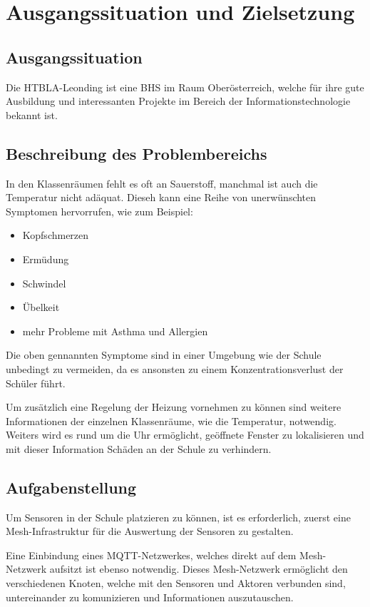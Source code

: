\chapter{Ausgangssituation und Zielsetzung}

\section{Ausgangssituation}
Die HTBLA-Leonding ist eine BHS im Raum Oberösterreich, welche für ihre gute Ausbildung und interessanten Projekte im Bereich der Informationstechnologie bekannt ist.

\section{Beschreibung des Problembereichs}
In den Klassenräumen fehlt es oft an Sauerstoff, manchmal ist auch die Temperatur nicht adäquat. Dieseh kann eine Reihe von unerwünschten Symptomen hervorrufen, wie zum Beispiel: 

\begin{itemize}
    \item Kopfschmerzen
    \item Ermüdung
    \item Schwindel
    \item Übelkeit
    \item mehr Probleme mit Asthma und Allergien
\end{itemize}

Die oben gennannten Symptome sind in einer Umgebung wie der Schule unbedingt zu vermeiden, da es ansonsten zu einem Konzentrationsverlust der Schüler führt.

Um zusätzlich eine Regelung der Heizung vornehmen zu können sind weitere Informationen der einzelnen Klassenräume, wie die Temperatur, notwendig. Weiters wird es rund um die Uhr ermöglicht,  geöffnete Fenster zu lokalisieren und mit dieser Information Schäden an der Schule zu verhindern.

\section{Aufgabenstellung}
Um Sensoren in der Schule platzieren zu können, ist es erforderlich, zuerst eine Mesh-Infrastruktur für die Auswertung der Sensoren zu gestalten.

Eine Einbindung eines MQTT-Netzwerkes, welches direkt auf dem Mesh-Netzwerk aufsitzt ist ebenso notwendig. Dieses Mesh-Netzwerk ermöglicht den verschiedenen Knoten, welche mit den Sensoren und Aktoren verbunden sind, untereinander zu komunizieren und Informationen auszutauschen.

